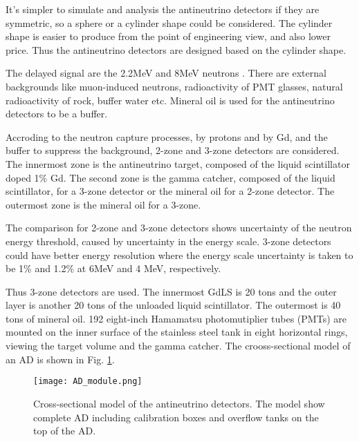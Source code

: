 It's simpler to simulate and analysis the antineutrino detectors if they are
symmetric, so a sphere or a cylinder shape could be considered. The cylinder
shape is easier to produce from the point of engineering view, and also lower
price. Thus the antineutrino detectors are designed based on the cylinder shape.

The delayed signal are the 2.2MeV and 8MeV neutrons . There are external backgrounds like
muon-induced neutrons, radioactivity of PMT glasses, natural radioactivity of rock,
buffer water etc. Mineral oil is used for the antineutrino detectors to be a buffer.

Accroding to the neutron capture processes, by protons and by Gd, and the buffer to
suppress the background, 2-zone and 3-zone detectors are considered. The innermost
zone is the antineutrino target, composed of the liquid scintillator doped 1\% Gd.
The second zone is the gamma catcher, composed of the liquid scintillator, for a
3-zone detector or the mineral oil for a 2-zone detector. The outermost zone
is the mineral oil for a 3-zone.



The comparison for 2-zone and 3-zone detectors shows 
uncertainty of the neutron energy threshold, caused by uncertainty in the energy scale.
3-zone detectors could have better energy resolution where the energy scale
uncertainty is taken to be 1\% and 1.2\% at 6MeV and 4 MeV, respectively.


Thus 3-zone detectors are used. The innermost GdLS is 20 tons and the outer layer is another
20 tons of the unloaded  liquid scintillator. The outermost is 40 tons of mineral oil. 192 eight-inch
Hamamatsu photomutiplier tubes (PMTs) are mounted on the inner surface of the stainless steel tank
in eight horizontal rings, viewing the target volume and the gamma catcher. The crooss-sectional model of an AD
is shown in Fig. \ref{fig:AD_module.png}.

\begin{figure}
    \centering
    \texttt{[image: AD\_module.png]}
    \caption{Cross-sectional model of the antineutrino detectors.
The model show complete AD including calibration boxes and overflow tanks on the top of the AD.}
    \label{fig:AD_module.png}
    \end{figure}





